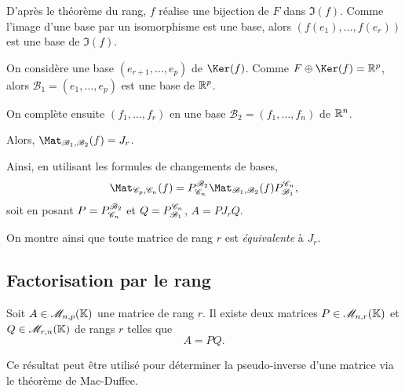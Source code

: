 \begin{solution}
\begin{reponses}
\item D'après le théorème du rang, $f$ réalise une bijection de $F$ dans $\Im(f)$. Comme l'image d'une base par un isomorphisme est une base, alors $(f(e_1),\ldots,f(e_r))$ est une base de $\Im(f)$.

\item On considère une base $(e_{r+1},\ldots,e_p)$ de $\Ker(f)$. Comme $F \oplus \Ker(f) = \R^p$, alors $\mathscr{B}_1 = (e_1,\ldots,e_p)$ est une base de $\mathbb{R}^p$.

On complète ensuite $(f_1,\ldots,f_r)$ en une base $\mathscr{B}_2 = (f_1,\ldots,f_n)$ de $\mathbb{R}^n$.

Alors, $\Mat_{\BB_1,\BB_2}(f) = J_r$.

Ainsi, en utilisant les formules de changements de bases,
\[
\Mat_{\CC_p, \CC_n}(f) = P_{\CC_n}^{\BB_2} \Mat_{\BB_1, \BB_2}(f) P_{\BB_1}^{\CC_n},
\]
soit en posant $P = P_{\mathscr{C}_n}^{\mathscr{B}_2}$ et $Q = P_{\mathscr{B}_1}^{\mathscr{C}_n}$, $A = P J_r Q$.
\end{reponses}
\end{solution}

\begin{remarque}
On montre ainsi que toute matrice de rang $r$ est \textit{équivalente} à $J_r$.
\end{remarque}

\subsection{Factorisation par le rang}

\begin{theo}{}
Soit $A \in \mathscr{M}_{n,p}(\mathbb{K})$ une matrice de rang $r$. Il existe deux matrices $P \in \mathscr{M}_{n,r}(\mathbb{K})$ et $Q \in \mathscr{M}_{r,n}(\mathbb{K})$ de rangs $r$ telles que
\[
A = P Q.
\]
\end{theo}

\begin{remarque}
Ce résultat peut être utilisé pour déterminer la pseudo-inverse d'une matrice via le théorème de Mac-Duffee.
\end{remarque}



